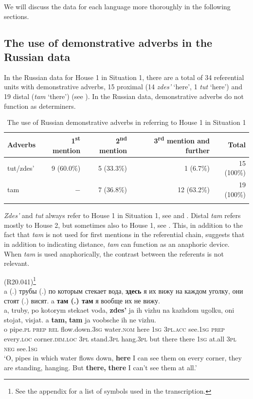\documentclass[output=paper,colorlinks,citecolor=brown]{langscibook}
\begin{document}
We will discuss the data for each language more thoroughly in the following sections. 

\subsection{The use of demonstrative adverbs in the Russian data}\label{sec:nahkola:4.1}

In the Russian data for House 1 in Situation 1, there are a total of 34 referential units with demonstrative adverbs, 15 proximal (14 \textit{zdes’} ‘here’, 1 \textit{tut} ‘here’) and 19 distal (\textit{tam} ‘there’) (see ). In the Russian data, demonstrative adverbs do not function as determiners.

\begin{table}
\begin{tabularx}{\textwidth}{Xrrrr}
\lsptoprule
{Adverbs} & {1\textsuperscript{st} mention} & {2\textsuperscript{nd} mention} & {3\textsuperscript{rd} mention and further} & {Total}\\
\midrule
{tut/zdes’} & {9 (60.0\%)} & {5 (33.3\%)} & {1 (6.7\%)} & {15 (100\%)}\\
{tam} & $-$ & {7 (36.8\%)} & {12 (63.2\%)} & {19 (100\%)}\\
\lspbottomrule
\end{tabularx}
\caption{The use of Russian demonstrative adverbs in referring to House 1 in Situation 1}
\label{tab:nahkola:4}
\end{table}

\textit{Zdes’} and \textit{tut} always refer to House 1 in Situation 1, see  and . Distal \textit{tam} refers mostly to House 2, but sometimes also to House 1, see . This, in addition to the fact that \textit{tam} is not used for first mentions in the referential chain, suggests that in addition to indicating distance, \textit{tam} can function as an anaphoric device. When \textit{tam} is used anaphorically, the contrast between the referents is not relevant.


\ea\label{ex:nahkola:1} (R20.041)\footnote{See the appendix for a list of symbols used in the transcription.}\\
{a (.) {трубы} (.) {по} {которым} {стекает} {вода}, \textbf{{здесь}} {я} {их} {вижу} {на} {каждом} {уголку}, {они} {стоят} (.) {висят}. a \textbf{{там} (.) {там}} {я} {вообще} {их} {не} {вижу}.} \\
\gll a, truby, po kotorym stekaet voda, \textbf{zdes’} ja ih vizhu na kazhdom ugolku, oni stojat, visjat. a \textbf{tam,} \textbf{tam} ja voobsche ih ne vizhu. \\
     o pipe.\textsc{pl} \textsc{prep} \textsc{rel} flow.down.\textsc{3sg} water.\textsc{nom} here \textsc{1sg} \textsc{3pl.acc} see.\textsc{1sg} \textsc{prep} every\textsc{.loc} corner.\textsc{dim.loc} \textsc{3pl} stand.\textsc{3pl} hang.\textsc{3pl} but there there \textsc{1sg} at.all \textsc{3pl} \textsc{neg} see.\textsc{1sg}\\
\glt ‘O, pipes in which water flows down, \textbf{here} I can see them on every corner, they are standing, hanging. But \textbf{there,} \textbf{there} I can’t see them at all.’ 
\z
\end{document}
